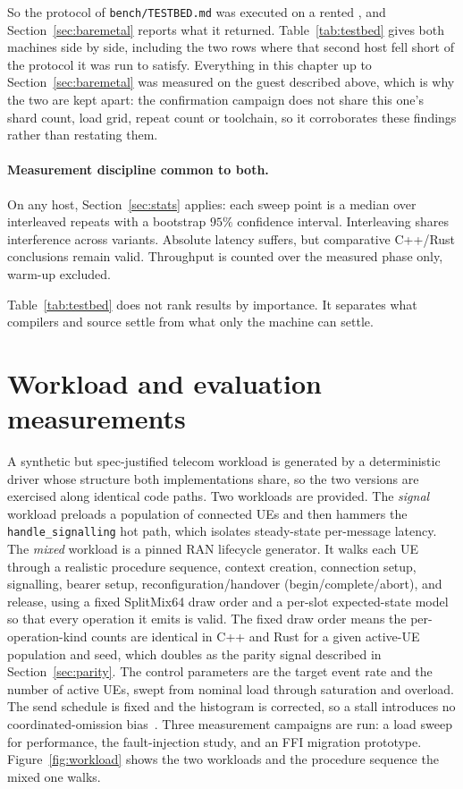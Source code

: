 \documentclass[english,oneside,a4paper,censored,csm,software-track-2020]{HYthesisML}
\begin{document}
So the protocol of \texttt{bench/TESTBED.md} was executed on a rented \BmCpu{}, and
Section~\ref{sec:baremetal} reports what it returned. Table~\ref{tab:testbed} gives both machines
side by side, including the two rows where that second host fell short of the protocol it was run
to satisfy. Everything in this chapter up to Section~\ref{sec:baremetal} was measured on the guest
described above, which is why the two are kept apart: the confirmation campaign does not share this
one's shard count, load grid, repeat count or toolchain, so it corroborates these findings rather
than restating them.

\paragraph{Measurement discipline common to both.}
On any host, Section~\ref{sec:stats} applies: each sweep point is a median over \NRepeats{}
interleaved repeats with a bootstrap $95\%$ confidence interval. Interleaving shares interference
across variants. Absolute latency suffers, but comparative C++/Rust conclusions remain valid.
Throughput is counted over the measured phase only, warm-up excluded.

Table~\ref{tab:testbed} does not rank results by importance. It separates what compilers and
source settle from what only the machine can settle.

\section{Workload and evaluation measurements\label{sec:workload}}
A synthetic but spec-justified telecom workload is generated by a deterministic driver whose
structure both implementations share, so the two versions are exercised along identical
code paths. Two workloads are provided. The \emph{signal} workload preloads a population of
connected UEs and then hammers the \texttt{handle\_signalling} hot path, which isolates
steady-state per-message latency. The \emph{mixed} workload is a pinned RAN lifecycle generator.
It walks each UE through a realistic procedure sequence, context creation, connection setup,
signalling, bearer setup, reconfiguration/handover (begin/complete/abort), and release, using a
fixed SplitMix64 draw order and a per-slot expected-state model so that every operation it emits
is valid. The fixed draw order means the per-operation-kind counts are identical in C++ and
Rust for a given active-UE population and seed, which doubles as the parity signal described in
Section~\ref{sec:parity}. The control parameters are the target event rate and the number of
active UEs, swept from nominal load through saturation and overload. The send schedule is fixed
and the histogram is corrected, so a stall introduces no coordinated-omission
bias~\cite{schroeder2006openclosed,tene_hdrhistogram}. Three measurement campaigns are run: a load sweep for
performance, the fault-injection study, and an FFI migration prototype.
Figure~\ref{fig:workload} shows the two workloads and the procedure sequence the mixed one
walks.
\end{document}
